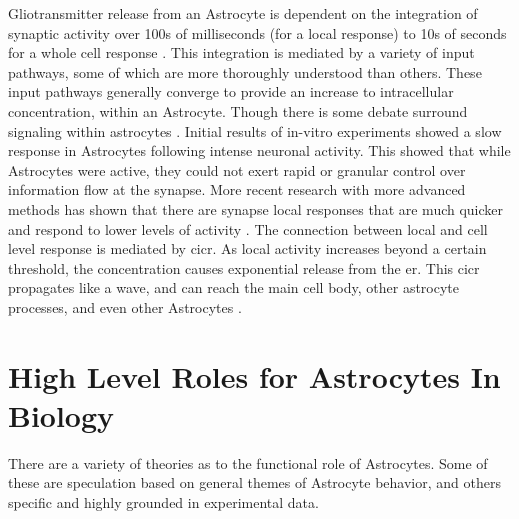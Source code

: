     Gliotransmitter release from an Astrocyte is dependent on the integration of
    synaptic activity over 100s of milliseconds (for a local response)
    \cite{pitta_2016} to 10s of seconds for a whole cell response
    \cite{mederos_2018}. This integration is mediated by a variety of input
    pathways, some of which are more thoroughly understood than others. These
    input pathways generally converge to provide an increase to intracellular
    \ca concentration, within an Astrocyte. Though there is some debate surround
    \ca signaling within astrocytes \cite{mederos_2018}. Initial results of
    in-vitro experiments showed a slow \ca response in Astrocytes following
    intense neuronal activity. This showed that while Astrocytes were active,
    they could not exert rapid or granular control over information flow at the
    synapse. More recent research with more advanced methods has shown that
    there are synapse local \ca responses that are much quicker and respond to
    lower levels of activity \cite{araque_2014}. The connection between local
    and cell level response is mediated by \Gls{cicr}. As local activity
    increases beyond a certain threshold, the \ca concentration causes
    exponential \ca release from the \Gls{er}. This \Gls{cicr} propagates like a
    wave, and can reach the main cell body, other astrocyte processes, and even
    other Astrocytes \cite{manninen_2018}.


    \section{High Level Roles for Astrocytes In Biology}

    There are a variety of theories as to the functional role of Astrocytes.
    Some of these are speculation based on general themes of Astrocyte behavior,
    and others specific and highly grounded in experimental data.

